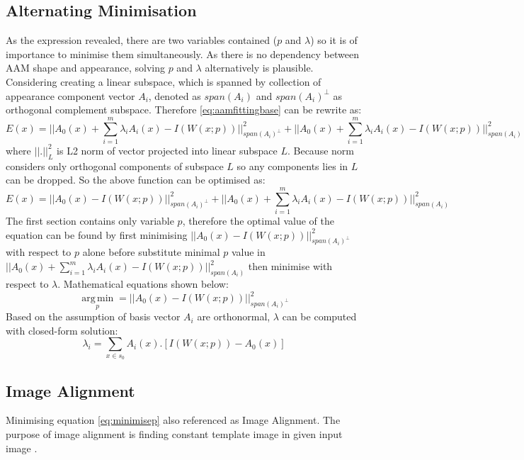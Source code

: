 \subsection{Alternating Minimisation}
As the expression revealed, there are two variables contained ($p$ and $\lambda$) so it is of importance to minimise them simultaneously. As there is no dependency between AAM shape and appearance, solving $p$ and $\lambda$ alternatively is plausible. Considering creating a linear subspace, which is spanned by collection of appearance component vector $A_i$, denoted as $span(A_i)$ and $span(A_i)^\perp$ as orthogonal complement subspace. Therefore \ref{eq:aamfittingbase} can be rewrite as:
\begin{equation} 
\label{eq:aamfittingappearancevariance}
E(x)=||A_0(x)+\sum^m_{i=1}\lambda_iA_i(x)-I(W(x;p))||^2_{span(A_i)^\perp}+||A_0(x)+\sum^m_{i=1}\lambda_iA_i(x)-I(W(x;p))||^2_{span(A_i)}
\end{equation}
where $||.||^2_L$ is L2 norm of vector projected into linear subspace $L$. Because norm considers only orthogonal components of subspace $L$ so any components lies in $L$ can be dropped. So the above function can be optimised as:
\begin{equation} 
\label{eq:aamfittingappearancevariancesubspace}
E(x)=||A_0(x)-I(W(x;p))||^2_{span(A_i)^\perp}+||A_0(x)+\sum^m_{i=1}\lambda_iA_i(x)-I(W(x;p))||^2_{span(A_i)}
\end{equation}
The first section contains only variable $p$, therefore the optimal value of the equation can be found by first minimising $||A_0(x)-I(W(x;p))||^2_{span(A_i)^\perp}$ with respect to $p$ alone before substitute minimal $p$ value in $||A_0(x)+\sum^m_{i=1}\lambda_iA_i(x)-I(W(x;p))||^2_{span(A_i)}$ then minimise with respect to $\lambda$. Mathematical equations shown below:
\begin{equation}
\label{eq:minimisep}
\operatorname*{arg\,min}_p=||A_0(x)-I(W(x;p))||^2_{span(A_i)^\perp}
\end{equation}
Based on the assumption of basis vector $A_i$ are orthonormal, $\lambda$ can be computed with closed-form solution:
\begin{equation}
\label{eq:minimiselambda}
\lambda_i=\sum_{x\in s_0}A_i(x).[I(W(x;p))-A_0(x)]
\end{equation}

\subsection{Image Alignment}
Minimising equation \ref{eq:minimisep} also referenced as Image Alignment. The purpose of image alignment is finding constant template image in given input image \cite{Matthews2004}. 

